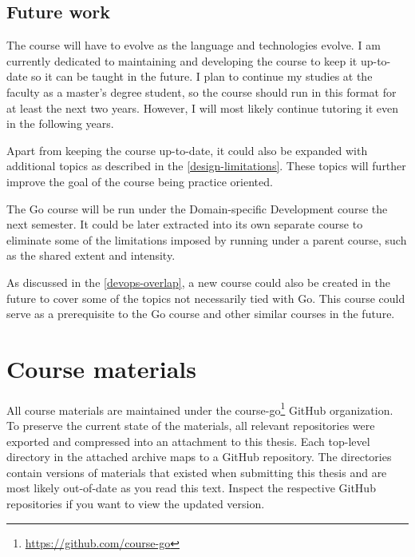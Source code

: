 \documentclass[
  digital,
  color,
  oneside,
  nosansbold,
  nocolorbold,
  nolof,
  nolot,
]{fithesis4}
\begin{document}
\section{Future work}

The course will have to evolve as the language and technologies evolve. I am currently dedicated to maintaining and developing the course to keep it up-to-date so it can be taught in the future. I plan to continue my studies at the faculty as a master's degree student, so the course should run in this format for at least the next two years. However, I will most likely continue tutoring it even in the following years.

Apart from keeping the course up-to-date, it could also be expanded with additional topics as described in the \cref{design-limitations}. These topics will further improve the goal of the course being practice oriented.

The Go course will be run under the Domain-specific Development course the next semester. It could be later extracted into its own separate course to eliminate some of the limitations imposed by running under a parent course, such as the shared extent and intensity.

As discussed in the \cref{devops-overlap}, a new course could also be created in the future to cover some of the topics not necessarily tied with Go. This course could serve as a prerequisite to the Go course and other similar courses in the future.

\printbibliography[heading=bibintoc]

\appendix
\chapter{Course materials}\label{apendix-materials}

All course materials are maintained under the course-go\footnote{\url{https://github.com/course-go}} GitHub organization. To preserve the current state of the materials, all relevant repositories were exported and compressed into an attachment to this thesis. Each top-level directory in the attached archive maps to a GitHub repository. The directories contain versions of materials that existed when submitting this thesis and are most likely out-of-date as you read this text. Inspect the respective GitHub repositories if you want to view the updated version.
\end{document}

